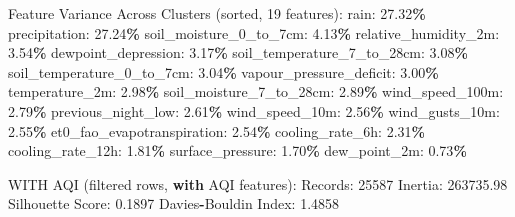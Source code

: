 \documentclass[
  letterpaper,
  DIV=11,
  numbers=noendperiod]{scrartcl}
\newenvironment{Shaded}{\begin{snugshade}}{\end{snugshade}}
\newcommand{\BuiltInTok}[1]{#1}
\newcommand{\ControlFlowTok}[1]{\textcolor[rgb]{0.13,0.29,0.53}{\textbf{#1}}}
\newcommand{\DecValTok}[1]{\textcolor[rgb]{0.00,0.00,0.81}{#1}}
\newcommand{\FloatTok}[1]{\textcolor[rgb]{0.00,0.00,0.81}{#1}}
\newcommand{\NormalTok}[1]{#1}
\newcommand{\OperatorTok}[1]{\textcolor[rgb]{0.81,0.36,0.00}{\textbf{#1}}}
\begin{document}
\begin{Shaded}
\begin{Highlighting}[]
\NormalTok{  Feature Variance Across Clusters (}\BuiltInTok{sorted}\NormalTok{, }\DecValTok{19}\NormalTok{ features):}
\NormalTok{    rain: }\FloatTok{27.32}\OperatorTok{\%}
\NormalTok{    precipitation: }\FloatTok{27.24}\OperatorTok{\%}
\NormalTok{    soil\_moisture\_0\_to\_7cm: }\FloatTok{4.13}\OperatorTok{\%}
\NormalTok{    relative\_humidity\_2m: }\FloatTok{3.54}\OperatorTok{\%}
\NormalTok{    dewpoint\_depression: }\FloatTok{3.17}\OperatorTok{\%}
\NormalTok{    soil\_temperature\_7\_to\_28cm: }\FloatTok{3.08}\OperatorTok{\%}
\NormalTok{    soil\_temperature\_0\_to\_7cm: }\FloatTok{3.04}\OperatorTok{\%}
\NormalTok{    vapour\_pressure\_deficit: }\FloatTok{3.00}\OperatorTok{\%}
\NormalTok{    temperature\_2m: }\FloatTok{2.98}\OperatorTok{\%}
\NormalTok{    soil\_moisture\_7\_to\_28cm: }\FloatTok{2.89}\OperatorTok{\%}
\NormalTok{    wind\_speed\_100m: }\FloatTok{2.79}\OperatorTok{\%}
\NormalTok{    previous\_night\_low: }\FloatTok{2.61}\OperatorTok{\%}
\NormalTok{    wind\_speed\_10m: }\FloatTok{2.56}\OperatorTok{\%}
\NormalTok{    wind\_gusts\_10m: }\FloatTok{2.55}\OperatorTok{\%}
\NormalTok{    et0\_fao\_evapotranspiration: }\FloatTok{2.54}\OperatorTok{\%}
\NormalTok{    cooling\_rate\_6h: }\FloatTok{2.31}\OperatorTok{\%}
\NormalTok{    cooling\_rate\_12h: }\FloatTok{1.81}\OperatorTok{\%}
\NormalTok{    surface\_pressure: }\FloatTok{1.70}\OperatorTok{\%}
\NormalTok{    dew\_point\_2m: }\FloatTok{0.73}\OperatorTok{\%}

\NormalTok{WITH AQI (filtered rows, }\ControlFlowTok{with}\NormalTok{ AQI features):}
\NormalTok{  Records: }\DecValTok{25587}
\NormalTok{  Inertia: }\FloatTok{263735.98}
\NormalTok{  Silhouette Score: }\FloatTok{0.1897}
\NormalTok{  Davies}\OperatorTok{{-}}\NormalTok{Bouldin Index: }\FloatTok{1.4858}


\end{Highlighting}
\end{Shaded}
\end{document}
